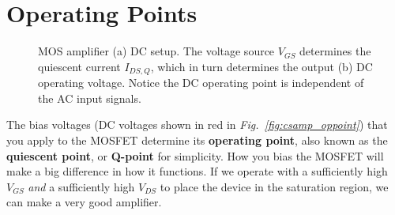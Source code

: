 \section{Operating Points}
\begin{figure}[tb]
\centering
{}
\caption{MOS amplifier (a) DC setup.  The voltage source $V_{GS}$ determines the quiescent current $I_{DS,Q}$, which in turn determines the output (b) DC operating voltage.  Notice the DC operating point is independent of the AC input signals.} 
\end{figure}
The bias voltages (DC voltages shown in red in \emph{Fig.~\ref{fig:csamp_oppoint}}) that you apply to the MOSFET determine its \textbf{operating point}, also known as the \textbf{quiescent point}, or \textbf{Q-point} for simplicity.  How you bias the MOSFET will make a big difference in how it functions.  If we operate with a sufficiently high $V_{GS}$ \emph{and} a sufficiently high $V_{DS}$ to place the device in the saturation region, we can make a very good amplifier.
